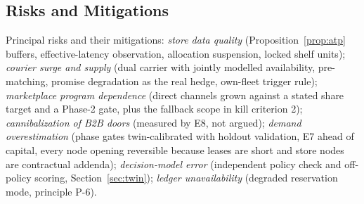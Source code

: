 \subsection{Risks and Mitigations}
Principal risks and their mitigations: \emph{store data quality} (Proposition~\ref{prop:atp} buffers, effective-latency observation, allocation suspension, locked shelf units); \emph{courier surge and supply} (dual carrier with jointly modelled availability, pre-matching, promise degradation as the real hedge, own-fleet trigger rule); \emph{marketplace program dependence} (direct channels grown against a stated share target and a Phase-2 gate, plus the fallback scope in kill criterion 2); \emph{cannibalization of B2B doors} (measured by E8, not argued); \emph{demand overestimation} (phase gates twin-calibrated with holdout validation, E7 ahead of capital, every node opening reversible because leases are short and store nodes are contractual addenda); \emph{decision-model error} (independent policy check and off-policy scoring, Section~\ref{sec:twin}); \emph{ledger unavailability} (degraded reservation mode, principle P-6).
